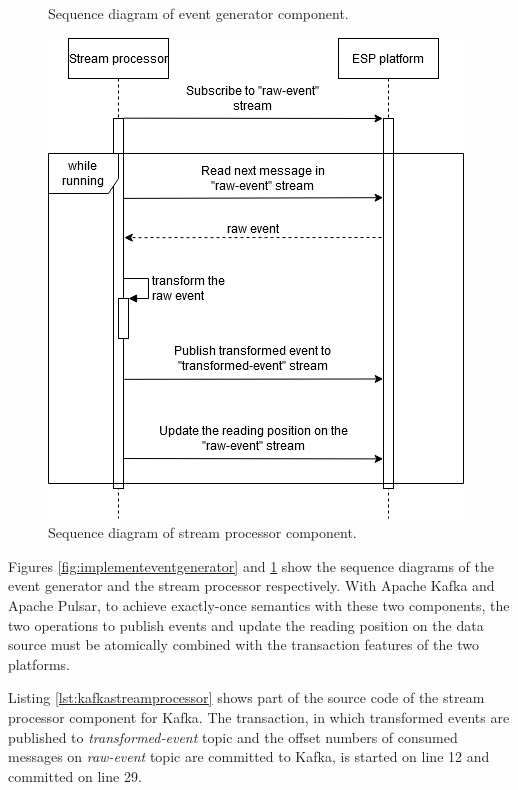 \begin{figure}[ht!]
\begin{adjustwidth}{-1cm}{-1cm}
\begin{minipage}[t]{.48\linewidth}
		\caption{Sequence diagram of event generator component.}
		\label{fig:implementeventgenerator}
	\end{minipage}%
	\hfill
	\begin{minipage}[t]{.48\linewidth}
		\centering
		\includegraphics[width=\linewidth]{images/implement-stream-processor.png}
		\caption{Sequence diagram of stream processor component.}
		\label{fig:implementstreamprocessor}
	\end{minipage}
	\end{adjustwidth}
\end{figure}

Figures \ref{fig:implementeventgenerator} and \ref{fig:implementstreamprocessor} show the sequence diagrams of the event generator and the stream processor respectively. With Apache Kafka and Apache Pulsar, to achieve exactly-once semantics with these two components,  the two operations to publish events and update the reading position on the data source must be atomically combined with the transaction features of the two platforms. 

Listing \ref{lst:kafkastreamprocessor} shows part of the source code of the stream processor component for Kafka. The transaction, in which transformed events are published to \emph{transformed-event} topic and the offset numbers of consumed messages on \emph{raw-event} topic are committed to Kafka, is started on line 12 and committed on line 29. 

